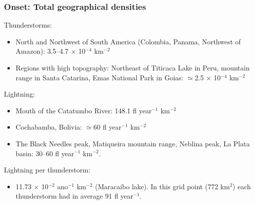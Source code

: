 \documentclass[smaller]{beamer}
\begin{document}
\begin{frame}
\frametitle{Onset: Total geographical densities}
Thunderstorms:
\begin{itemize}
\item North and Northwest of South America (Colombia, Panama, Northwest of Amazon): 3.5--4.7 $\times$ 10$^{-4}$ km$^{-2}$
\item Regions with high topography: Northeast of Titicaca Lake in Peru, mountain range in Santa Catarina, Emas National Park in Goias: $\simeq$2.5 $\times$ 10$^{-4}$ km$^{-2}$
\end{itemize}
Lightning:
\begin{itemize}
\item Mouth of the Catatumbo River: 148.1 fl year$^{-1}$ km$^{-2}$ 
\item Cochabamba, Bolivia: $\simeq$60 fl year$^{-1}$ km$^{-2}$
\item The Black Needles peak, Matiqueira mountain range, Neblina peak, La Plata basin: 30--60 fl year$^{-1}$ km$^{-2}$.  
\end{itemize}
Lightning per thunderstorm:
\begin{itemize}
\item 11.73 $\times$ 10$^{-2}$ ano$^{-1}$ km$^{-2}$ (Maracaibo lake). In this grid point (772 km$^{2}$) each thunderstorm had in average 91 fl year$^{-1}$.  
\end{itemize}

\end{frame}

\end{document}
